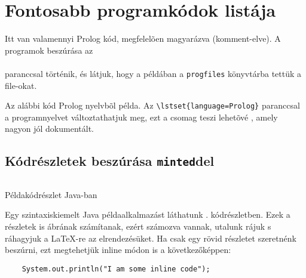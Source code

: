 \chapter{Fontosabb programkódok listája}\label{ch:progik}


Itt van valamennyi Prolog kód, megfelelõen magyarázva (komment-elve). A programok beszúrása az\\
\verb++\\
paranccsal történik, és látjuk, hogy a példában a \verb+progfiles+ könyvtárba tettük a file-okat.

Az alábbi kód Prolog nyelvbõl példa. Az \verb+\lstset{language=Prolog}+ paranccsal a programnyelvet változtathatjuk meg, ezt a  csomag teszi lehetõvé \cite{listingCite}, amely nagyon jól dokumentált.


%

\section{Kódrészletek beszúrása \texttt{minted}del}

\begin{listing}[b!]
  \inputminted{java}{progfiles/HelloWorld.java}
  \caption{Példakódrészlet Java-ban}
  \label{lst:javahw}
\end{listing}

Egy szintaxiskiemelt Java példaalkalmazást láthatunk . kódrészletben. Ezek a részletek is ábrának számítanak, ezért számozva vannak, utalunk rájuk s ráhagyjuk a \LaTeX-re az elrendezésüket. Ha csak egy rövid részletet szeretnénk beszúrni, ezt megtehetjük inline módon is a következőképpen:

\begin{verbatim}
    System.out.println("I am some inline code");
\end{verbatim}
